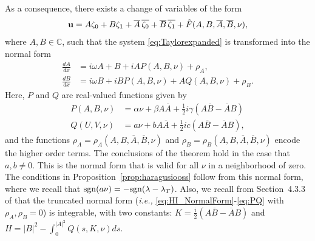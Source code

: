\documentclass[11pt]{article}
\numberwithin{equation}{section}
\begin{document}
As a consequence, there exists a change of variables of the form 
%
\begin{equation} \label{eq:app_trans}
{\bf u} = A \zeta_0 + B \zeta_1 + \overline{A} \, \overline{\zeta_0} +\overline{B} \, \overline{\zeta_1} + \tilde{F} (A,B,\overline{A},\overline{B},\nu), 
\end{equation}
%
where $A,B \in \mathbb{C}$,
such that the system \eqref{eq:Taylorexpanded} is transformed into the normal form
%
\begin{equation} \label{eq:HI_NormalForm}
\begin{split}
    \tfrac{dA}{dx} &= i \omega A + B + i A P(A,B,\nu) + \rho_A, \\ 
    \tfrac{dB}{dx} &= i \omega B + i B P(A,B,\nu) + A Q(A,B,\nu) + \rho_B.
\end{split}
\end{equation}
%
Here, $P$ and $Q$ are real-valued functions given by 
%
\begin{equation}\label{eq:PQ}
\begin{split}
    P(A,B,\nu) &= \alpha \nu + \beta A \overline{A} + \tfrac{1}{2} i \gamma \left( A \overline{B} - \overline{A} B \right) \\ 
    Q(U,V,\nu) &= a \nu + b A \overline{A} + \tfrac{1}{2} i c \left( A \overline{B} - \overline{A} B \right),
\end{split}
\end{equation}
%
and the functions $\rho_A=\rho_A(A,B,\overline{A},\overline{B},\nu)$ and $\rho_B=\rho_B(A,B,\overline{A},\overline{B},\nu)$ encode the higher order terms.
The conclusions of the theorem hold in the case that $a,b \ne 0$.
This is the normal form that is valid for all $\nu$ in a neighborhood of zero.
The conditions in Proposition~\ref{prop:haragusiooss} follow from this normal form, where we recall that ${\rm sgn}(a\nu) = - {\rm sgn}(\lambda-\lambda_T)$.
Also, we recall from Section~4.3.3 of \cite{HI2011} that the truncated normal form ({\it i.e.,} \eqref{eq:HI_NormalForm}-\eqref{eq:PQ} with $\rho_A, \rho_B = 0$)
is integrable, with two constants:
$K= \frac{i}{2}(A \overline{B} - \overline{A} B)$
and $H = \vert B \vert^2 - \int_0^{\vert A\vert^2} Q(s,K,\nu)ds$.
\end{document}
